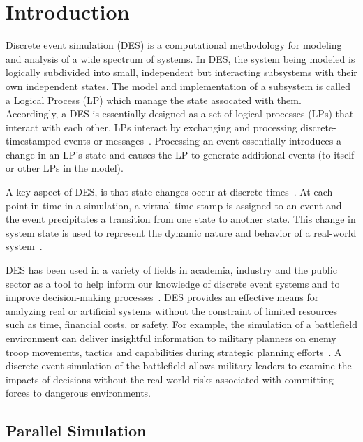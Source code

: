 \chapter{Introduction} 

Discrete event simulation (DES) is a computational methodology for
modeling and analysis of a wide spectrum of systems.  In DES, the
system being modeled is logically subdivided into small, independent
but interacting subsystems with their own independent states.  The
model and implementation of a subsystem is called a Logical Process
(LP) which manage the state assocated with them.  Accordingly, a DES
is essentially designed as a set of logical processes (LPs) that
interact with each other.  LPs interact by exchanging and processing
discrete-timestamped events or messages~\cite{jafer-13}.  Processing
an event essentially introduces a change in an LP's state and causes
the LP to generate additional events (to itself or other LPs in the
model).

A key aspect of DES, is that state changes occur at discrete
times~\cite{fishman-13}.  At each point in time in a simulation, a
virtual time-stamp is assigned to an event and the event precipitates
a transition from one state to another state. This change in system
state is used to represent the dynamic nature and behavior of a
real-world system~\cite{fujimoto-90}.

DES has been used in a variety of fields in academia, industry and the
public sector as a tool to help inform our knowledge of discrete event
systems and to improve decision-making
processes~\cite{fishman-13}. DES provides an effective means for
analyzing real or artificial systems without the constraint of limited
resources such as time, financial costs, or safety. For example, the
simulation of a battlefield environment can deliver insightful
information to military planners on enemy troop movements, tactics and
capabilities during strategic planning efforts~\cite{hill-01}. A
discrete event simulation of the battlefield allows military leaders
to examine the impacts of decisions without the real-world risks
associated with committing forces to dangerous environments.

\section{Parallel Simulation}

